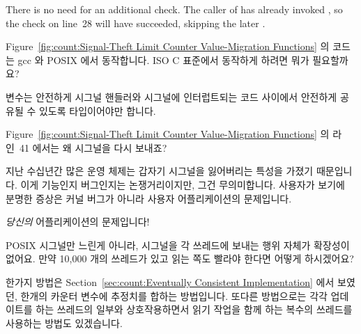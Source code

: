 \begin{enumerate}
	There is no need for an additional check.
	The caller of  has already invoked
	, so the check on line~28 will have
	succeeded, skipping the later .
	\fi

\QuickQ{}
	Figure~\ref{fig:count:Signal-Theft Limit Counter Value-Migration Functions}
	의 코드는 gcc 와 POSIX 에서 동작합니다.
	ISO C 표준에서 동작하게 하려면 뭐가 필요할까요?

\QuickA{}
	 변수는 안전하게 시그널 핸들러와 시그널에 인터럽트되는 코드
	사이에서 안전하게 공유될 수 있도록  타입이어야만
	합니다.

\QuickQ{}
	Figure~\ref{fig:count:Signal-Theft Limit Counter Value-Migration
	Functions} 의 라인~41 에서는 왜 시그널을 다시 보내죠?

\QuickA{}
	지난 수십년간 많은 운영 체제는 갑자기 시그널을 잃어버리는 특성을 가졌기
	때문입니다.
	이게 기능인지 버그인지는 논쟁거리이지만, 그건 무의미합니다.
	사용자가 보기에 분명한 증상은 커널 버그가 아니라 사용자
	어플리케이션의 문제입니다.

	\emph{당신의} 어플리케이션의 문제입니다!

\QuickQ{}
	POSIX 시그널만 느린게 아니라, 시그널을 각 쓰레드에 보내는 행위 자체가
	확장성이 없어요.
	만약 10,000 개의 쓰레드가 있고 읽는 쪽도 빨라야 한다면 어떻게
	하시겠어요?

\QuickA{}
	한가지 방법은
	Section~\ref{sec:count:Eventually Consistent Implementation} 에서
	보였던, 한개의 카운터 변수에 추정치를 합하는 방법입니다.
	또다른 방법으로는 각각 업데이트를 하는 쓰레드의 일부와 상호작용하면서
	읽기 작업을 함께 하는 복수의 쓰레드를 사용하는 방법도 있겠습니다.
	\iffalse


\end{enumerate}
